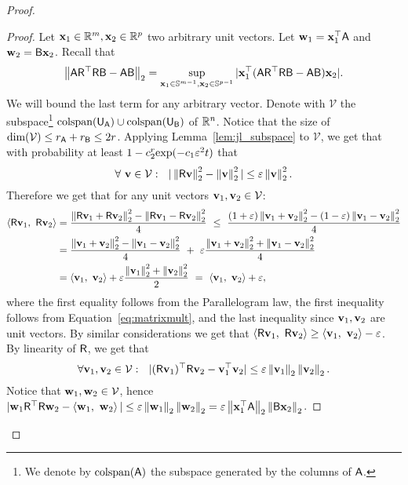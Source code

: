 \begin{proof}
\begin{proof}
%
Let $\mathbf{x}_1\in{\mathbb{R}^m},\mathbf{x}_2\in{\mathbb{R}^{p}}$ two arbitrary unit vectors. Let ${\mathbf{w}}_1= \mathbf{x}_1^\top {\ensuremath{\mathsf{A} }}$ and ${\mathbf{w}}_2={\mathsf{B} } \mathbf{x}_2$. Recall that
%
\[\left\|{\mathsf{A} } {\mathsf{R} }^\top {\ensuremath{\mathsf{R} }}{\ensuremath{\mathsf{B} }} - {\mathsf{A} } {\mathsf{B} }\right\|_2 = \sup_{\mathbf{x}_1\in{\mathbb{S}^{m-1}}, \mathbf{x}_2\in{\mathbb{S}^{p-1}} } | \mathbf{x}_1^\top({\mathsf{A} } {\mathsf{R} }^\top {\ensuremath{\mathsf{R} }}{\ensuremath{\mathsf{B} }} - {\mathsf{A} } {\mathsf{B} })\mathbf{x}_2|.\]
%
We will bound the last term for any arbitrary vector. Denote with $\mathcal{V}$ the subspace\footnote{We denote by $\text{colspan}({\mathsf{A} })$ the subspace generated by the columns of ${\mathsf{A} }$.} $\text{colspan}({\mathsf{U} }_{{\mathsf{A} }})\cup \text{colspan}({\mathsf{U} }_{{\mathsf{B} }})$ of $\mathbb{R}^n$. Notice that the size of $\text{dim}(\mathcal{V}) \leq r_{{\mathsf{A} }} + r_{{\mathsf{B} }} \leq 2r$. Applying Lemma~\ref{lem:jl_subspace} to $\mathcal{V}$, we get that with probability at least $1-c_2^{r}\hbox{\textrm exp}(-c_1\varepsilon^2 t)$ that
\begin{equation}\label{eq:matrixmult}
\forall\ {\mathbf v} \in{\mathcal{V}}: \  \ |\left\|{\mathsf{R} } {\mathbf v}\right\|_2^2- \left\|{\mathbf v}\right\|_2^2 | \leq \varepsilon \left\|{\mathbf v}\right\|_2^2.
\end{equation}
Therefore we get that for any unit vectors ${\mathbf v}_1,{\mathbf v}_2\in{\mathcal{V}}$:
\begin{align*}
 \ip{\matR\v_1}{\matR\v_2}	&   =   \dfrac{\norm{ \matR\v_1 + \matR\v_2}^2-\norm{\matR\v_1 - \matR\v_2}^2}{4} \ \leq \ \dfrac{(1+\eps)\norm{\v_1+\v_2}^2-(1-\eps)\norm{\v_1-\v_2}^2}{4}\\
  		    	&   =   \dfrac{\norm{\v_1+\v_2}^2-\norm{\v_1-\v_2}^2}{4} \ + \  \eps \dfrac{\norm{\v_1+\v_2}^2+\norm{\v_1-\v_2}^2}{4}\\
			&   =   \ip{\v_1}{\v_2} + \eps \frac{\norm{\v_1}^2+\norm{\v_2}^2}{2}\ =\ \ip{\v_1}{\v_2} + \eps,
\end{align*}
where the first equality follows from the Parallelogram law, the first inequality follows from Equation~\eqref{eq:matrixmult}, and the last inequality since ${\mathbf v}_1,{\mathbf v}_2$ are unit vectors. By similar considerations we get that $\left\langle { {\ensuremath{\mathsf{R} }}{\mathbf v}_1},\ {{\mathsf{R} }{\mathbf v}_2} \right\rangle  \geq \left\langle {{\mathbf v}_1},\ {{\mathbf v}_2} \right\rangle - \varepsilon$. By linearity of ${\mathsf{R} }$, we get that
%
\[\forall {\mathbf v}_1,{\mathbf v}_2 \in{\mathcal{V} }: \  \ |({\mathsf{R} }{\mathbf v}_1)^\top {\ensuremath{\mathsf{R} }}{\mathbf v}_2 - {\mathbf v}_1^\top {\mathbf v}_2 | \leq \varepsilon \left\|{\mathbf v}_1\right\|_2\left\|{\mathbf v}_2\right\|_2 .  \]
%
Notice that ${\mathbf{w}}_1,{\mathbf{w}}_2\in{\mathcal{V} }$, hence $ |{\mathbf{w}}_1 {\mathsf{R} }^\top {\ensuremath{\mathsf{R} }} {\mathbf{w}}_2 - \left\langle {{\mathbf{w}}_1},\ {{\mathbf{w}}_2} \right\rangle| \leq \varepsilon \left\|{\mathbf{w}}_1\right\|_2\left\|{\mathbf{w}}_2\right\|_2 = \varepsilon \left\|\mathbf{x}_1^\top {\ensuremath{\mathsf{A} }}\right\|_2\left\|{\mathsf{B} }\mathbf{x}_2\right\|_2$.
\end{proof}

\end{proof}
